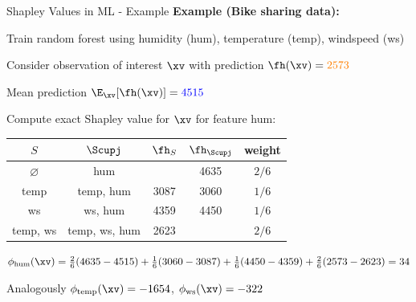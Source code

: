 \documentclass[10pt,compress,t,notes=noshow, xcolor=table]{beamer}
\begin{document}
\begin{framev}[align=top]{Shapley Values in ML - Example}
\textbf{Example (Bike sharing data):}
\begin{itemizeM}
\item Train random forest using humidity (hum), temperature (temp), windspeed (ws)
\item Consider observation of interest $\xv$ with prediction $\fh(\xv) = \color{orange}{2573}$
\item Mean prediction $\E_{\xv}[\fh(\xv)] = \color{blue}{4515}$
\item Compute exact Shapley value for $\xv$ for feature hum:
\end{itemizeM}
\begin{center}
\begin{tabular}{c|c|c|c|c}
$S$ & $\Scupj$ & $\fh_S$ & $\fh_{\Scupj}$ & weight\\\hline
$\varnothing$& hum & \color{blue}{4515} & 4635 & $2/6$\\
temp & temp, hum & 3087 & 3060& $1/6$\\
ws & ws, hum & 4359 & 4450 & $1/6$\\
temp, ws & temp, ws, hum & 2623 & \color{orange}{2573} & $2/6$
\end{tabular}
\end{center}
\begin{itemizeM}
\item[$\Rightarrow$] {\small $\phi_{\text{hum}}(\xv) = \tfrac{2}{6}(4635-4515) + \tfrac{1}{6}(3060-3087) + \tfrac{1}{6}(4450-4359) + \tfrac{2}{6}(2573-2623) = 34$}
\item[$\Rightarrow$] {\small Analogously $\phi_{\text{temp}}(\xv) = -1654$, $\phi_{\text{ws}}(\xv) = -322$}
\end{itemizeM}
\end{framev}
\end{document}
